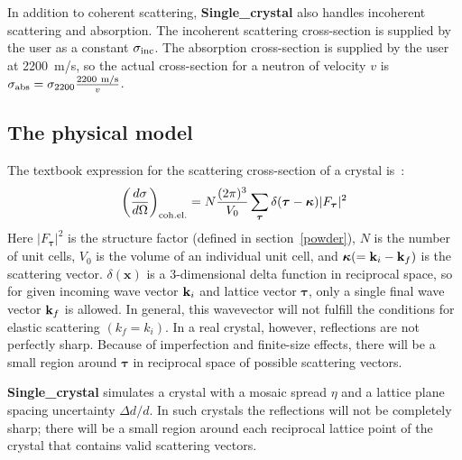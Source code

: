 In addition to coherent scattering, {\bf Single\_crystal} also
handles incoherent scattering and absorption. The incoherent scattering
cross-section is supplied by the user as a constant
$\sigma_{\rm inc}$. The absorption cross-section is supplied by the user at
2200~m/s, so the actual cross-section for a neutron of velocity $v$ is
$\sigma_{\rm abs} = \sigma_{2200} \frac{\rm 2200~m/s}{v}$.

\subsection{The physical model}

The textbook expression for the scattering cross-section of a crystal
is~\cite[ch.3]{squires}:
\begin{equation}
\label{eq:sigma_coh_el}
\left(\frac{d\sigma}{d\Omega}\right)_{\rm coh.el.} =
        N\frac{(2\pi)^3}{V_0}\sum_{\boldsymbol{\tau}}
        \delta(\boldsymbol{\tau} - \boldsymbol{\kappa})|F_{\boldsymbol{\tau}}|^2
\end{equation}
Here $|F_{\boldsymbol{\tau}}|^2$ is the structure factor
(defined in section~\ref{powder}), $N$ is the
number of unit cells, $V_0$ is the volume of an
individual unit cell, and $\boldsymbol{\kappa} (= {\bf k}_i - {\bf k}_f)$
is the scattering vector. $\delta(\boldsymbol{x})$ is a 3-dimensional delta
function in reciprocal space,
so for given incoming wave vector ${\bf k}_i$ and lattice vector
${\boldsymbol{\tau}}$, only a single final wave vector ${\bf k}_f$ is allowed.
In general, this wavevector will not fulfill the conditions for elastic
scattering $(k_f = k_i)$.
In a real crystal, however, reflections are not perfectly sharp. Because
of imperfection and finite-size effects, there will be a small region
around $\boldsymbol{\tau}$ in reciprocal space of possible scattering vectors.

{\bf Single\_crystal} simulates a crystal with a mosaic spread
$\eta$ and a lattice plane spacing uncertainty $\Delta d/d$. In such
crystals the reflections will not be completely sharp;
there will be a small region around each reciprocal lattice point of the
crystal that contains valid scattering vectors.

